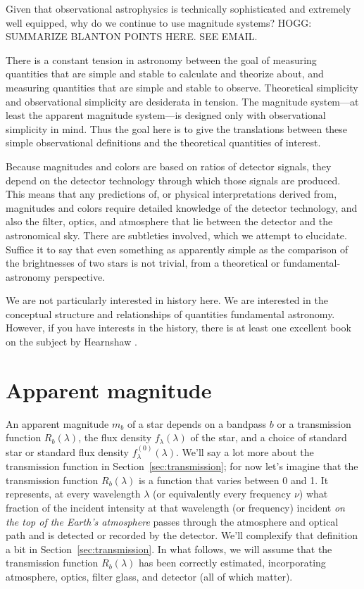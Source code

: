 \documentclass[10pt]{article}
\newcommand{\sectionname}{Section}
\newcommand{\secref}[1]{\sectionname~\ref{#1}}
\begin{document}
Given that observational astrophysics is technically sophisticated and extremely well equipped, why do we continue to use magnitude systems?
HOGG: SUMMARIZE BLANTON POINTS HERE. SEE EMAIL.

There is a constant tension in astronomy between the goal of measuring quantities that are simple and stable to calculate and theorize about, and measuring quantities that are simple and stable to observe.
Theoretical simplicity and observational simplicity are desiderata in tension.
The magnitude system---at least the apparent magnitude system---is designed only with observational simplicity in mind.
Thus the goal here is to give the translations between these simple observational definitions and the theoretical quantities of interest.

Because magnitudes and colors are based on ratios of detector signals, they depend on the detector technology through which those signals are produced.
This means that any predictions of, or physical interpretations derived from, magnitudes and colors require detailed knowledge of the detector technology, and also the filter, optics, and atmosphere that lie between the detector and the astronomical sky.
There are subtleties involved, which we attempt to elucidate.
Suffice it to say that even something as apparently simple as the comparison of the brightnesses of two stars is not trivial, from a theoretical or fundamental-astronomy perspective.

We are not particularly interested in history here.
We are interested in the conceptual structure and relationships of quantities fundamental astronomy.
However, if you have interests in the history, there is at least one excellent book on the subject by Hearnshaw \cite{hearnshaw}.

\section{Apparent magnitude}\label{sec:mag}

An apparent magnitude $m_b$ of a star depends on a bandpass $b$ or a transmission function $R_b(\lambda)$, the flux density $f_\lambda(\lambda)$ of the star, and a choice of standard star or standard flux density $f^{(0)}_\lambda(\lambda)$.
We'll say a lot more about the transmission function in \secref{sec:transmission};
for now let's imagine that the transmission function $R_b(\lambda)$ is a function that varies between 0 and 1.
It represents, at every wavelength $\lambda$ (or equivalently every frequency $\nu$) what fraction of the incident intensity at that wavelength (or frequency) incident \emph{on the top of the Earth's atmosphere} passes through the atmosphere and optical path and is detected or recorded by the detector.
We'll complexify that definition a bit in \secref{sec:transmission}.
In what follows, we will assume that the transmission function $R_b(\lambda)$ has been correctly estimated, incorporating atmosphere, optics, filter glass, and detector (all of which matter).
\end{document}
